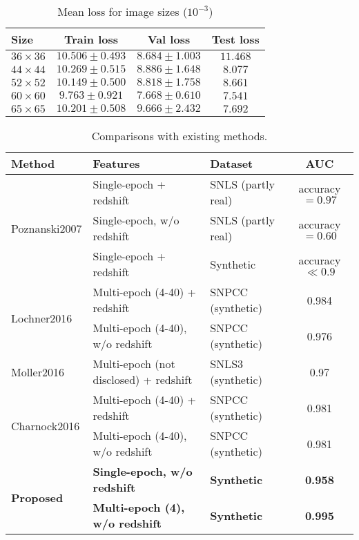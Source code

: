 \documentclass[conference,compsoc]{IEEEtran}
\begin{document}
{\footnotesize
\begin{table}[t]
  \centering
  \caption{Mean loss for image sizes ($10^{-3}$)}
  \label{table:size_lightcurve}
  \begin{tabular}{|l||c|c|c|} \hline
    Size          & Train loss       & Val loss          & Test loss \\ \hline \hline
    $36\times 36$ & $10.506\pm 0.493$ & $8.684\pm 1.003$ & $11.468$  \\ \hline
    $44\times 44$ & $10.269\pm 0.515$ & $8.886\pm 1.648$ & $ 8.077$  \\ \hline
    $52\times 52$ & $10.149\pm 0.500$ & $8.818\pm 1.758$ & $ 8.661$  \\ \hline
    $60\times 60$ & $ 9.763\pm 0.921$ & $7.668\pm 0.610$ & $ 7.541$  \\ \hline
    $65\times 65$ & $10.201\pm 0.508$ & $9.666\pm 2.432$ & $ 7.692$  \\ \hline
  \end{tabular}
\end{table}
}

{\footnotesize
\begin{table*}[t]
  \caption{%
    Comparisons with existing methods.
  }
  \label{table:compare_classify}
  \begin{center}
    \begin{tabular}{|l||l|l|c|} \hline
      Method & Features & Dataset & AUC \\ \hline \hline
      \multirow{3}{*}{Poznanski2007 \cite{Poznanski2007}} & Single-epoch + redshift & SNLS (partly real) & accuracy$=0.97$ \\ \cline{2-4}
       & Single-epoch, w/o redshift & SNLS (partly real) & accuracy$=0.60$ \\ \cline{2-4}
       & Single-epoch + redshift & Synthetic & accuracy$\ll 0.9$ \\ \hline
      \multirow{2}{*}{Lochner2016 \cite{Lochner2016}} & Multi-epoch (4-40) + redshift & SNPCC (synthetic) & 0.984 \\ \cline{2-4}
       & Multi-epoch (4-40), w/o redshift & SNPCC (synthetic) & 0.976 \\ \hline
      Moller2016 \cite{Moller2016} & Multi-epoch (not disclosed) + redshift & SNLS3 (synthetic) & 0.97 \\ \hline
      \multirow{2}{*}{Charnock2016 \cite{Charnock2016}} & Multi-epoch (4-40) + redshift & SNPCC (synthetic) & 0.981 \\ \cline{2-4}
       & Multi-epoch (4-40), w/o redshift & SNPCC (synthetic) & 0.981 \\ \hline
      \multirow{2}{*}{\textbf{Proposed}} & \textbf{Single-epoch, w/o redshift} & \textbf{Synthetic} & \textbf{0.958} \\ \cline{2-4}
       & \textbf{Multi-epoch (4), w/o redshift} & \textbf{Synthetic} & \textbf{0.995} \\ \hline
    \end{tabular}
  \end{center}
\end{table*}
}
\end{document}
